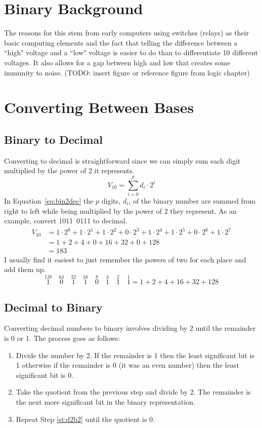 \section{Binary Background}
The reasons for this stem from early computers 
using switches (relays) as their basic computing elements and the fact that telling the 
difference between a ``high" voltage and a ``low" voltage is easier to do than to differentiate
10 different voltages. It also allows for a gap between high and low that creates some 
immunity to noise. (TODO: insert figure or reference figure from logic chapter) 

\section{Converting Between Bases}
\subsection{Binary to Decimal}
Converting to decimal is straightforward since we can simply sum each digit multiplied by the 
power of 2 it represents. 
\begin{equation}
	\label{eq:bin2dec}
	V_{10} = \sum_{i=0}^p d_i \cdot 2^i
\end{equation}
In Equation~\ref{eq:bin2dec} the $p$ digits, $d_i$, of the binary number are summed from right 
to left while being multiplied by the power of 2 they represent. As an example, convert 
1011~0111 to decimal.
\begin{equation}
	\begin{split}
	V_{10} &= 1\cdot2^0 + 1\cdot2^1 + 1\cdot2^2 + 0\cdot2^3 + 1\cdot2^4 + 1\cdot2^5 + 0\cdot2^6 + 1\cdot2^7\\
		&= 1 + 2 + 4 + 0 + 16 + 32 + 0 + 128\\
		&= 183
	\end{split}
\end{equation}
I usually find it easiest to just remember the powers of two for each place and add them up.
\begin{equation}
	\overset{128}{1}\quad\overset{64}{0}\quad\overset{32}{1}\quad\overset{16}{1}\quad\overset{8}{0}\quad
	\overset{4}{1}\quad\overset{2}{1}\quad\overset{1}{1} = 1 + 2 + 4 + 16 + 32 + 128
\end{equation}

\subsection{Decimal to Binary}
Converting decimal numbers to binary involves dividing by 2 until the remainder is 0 or 1. The process
goes as follows:
\begin{enumerate}
	\item  Divide the number by 2. If the remainder is 1 then the least significant bit is 1 otherwise if the remainder is 0 
	(it was an even number) then the least significant bit is 0.
	\item \label{st:d2b2}Take the quotient from the previous step and divide by 2. The remainder is the next more significant bit in the binary representation.
	\item Repeat Step \ref{st:d2b2} until the quotient is 0.
\end{enumerate}

